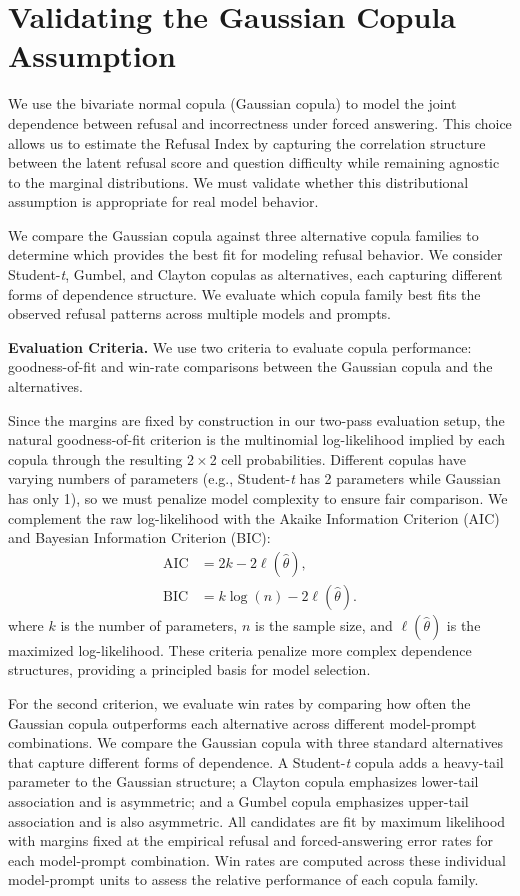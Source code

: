 \section{Validating the Gaussian Copula Assumption}
\label{app:copula_validation}

We use the bivariate normal copula (Gaussian copula) to model the joint dependence between refusal and incorrectness under forced answering. This choice allows us to estimate the Refusal Index by capturing the correlation structure between the latent refusal score and question difficulty while remaining agnostic to the marginal distributions. We must validate whether this distributional assumption is appropriate for real model behavior.

We compare the Gaussian copula against three alternative copula families to determine which provides the best fit for modeling refusal behavior. We consider Student-\emph{t}, Gumbel, and Clayton copulas as alternatives, each capturing different forms of dependence structure. We evaluate which copula family best fits the observed refusal patterns across multiple models and prompts.


\noindent\textbf{Evaluation Criteria.}
We use two criteria to evaluate copula performance: goodness-of-fit and win-rate comparisons between the Gaussian copula and the alternatives.

Since the margins are fixed by construction in our two-pass evaluation setup, the natural goodness-of-fit criterion is the multinomial log-likelihood implied by each copula through the resulting 2\,$\times$\,2 cell probabilities. Different copulas have varying numbers of parameters (e.g., Student-\emph{t} has 2 parameters while Gaussian has only 1), so we must penalize model complexity to ensure fair comparison. We complement the raw log-likelihood with the Akaike Information Criterion (AIC) and Bayesian Information Criterion (BIC):
\begin{align}
\text{AIC} &= 2k - 2\ell(\hat{\theta}),\\
\text{BIC} &= k\log(n) - 2\ell(\hat{\theta}).
\end{align}
where $k$ is the number of parameters, $n$ is the sample size, and $\ell(\hat{\theta})$ is the maximized log-likelihood. These criteria penalize more complex dependence structures, providing a principled basis for model selection.

For the second criterion, we evaluate win rates by comparing how often the Gaussian copula outperforms each alternative across different model-prompt combinations. We compare the Gaussian copula with three standard alternatives that capture different forms of dependence. A Student-\emph{t} copula adds a heavy-tail parameter to the Gaussian structure; a Clayton copula emphasizes lower-tail association and is asymmetric; and a Gumbel copula emphasizes upper-tail association and is also asymmetric. All candidates are fit by maximum likelihood with margins fixed at the empirical refusal and forced-answering error rates for each model-prompt combination. Win rates are computed across these individual model-prompt units to assess the relative performance of each copula family.

